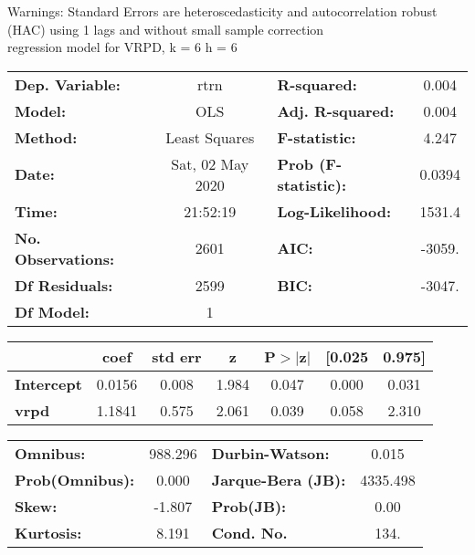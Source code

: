 Warnings: \newline
 [1] Standard Errors are heteroscedasticity and autocorrelation robust (HAC) using 1 lags and without small sample correction\\ 

regression model for VRPD, k = 6 h = 6\begin{center}
\begin{tabular}{lclc}
\toprule
\textbf{Dep. Variable:}    &       rtrn       & \textbf{  R-squared:         } &     0.004   \\
\textbf{Model:}            &       OLS        & \textbf{  Adj. R-squared:    } &     0.004   \\
\textbf{Method:}           &  Least Squares   & \textbf{  F-statistic:       } &     4.247   \\
\textbf{Date:}             & Sat, 02 May 2020 & \textbf{  Prob (F-statistic):} &   0.0394    \\
\textbf{Time:}             &     21:52:19     & \textbf{  Log-Likelihood:    } &    1531.4   \\
\textbf{No. Observations:} &        2601      & \textbf{  AIC:               } &    -3059.   \\
\textbf{Df Residuals:}     &        2599      & \textbf{  BIC:               } &    -3047.   \\
\textbf{Df Model:}         &           1      & \textbf{                     } &             \\
\bottomrule
\end{tabular}
\begin{tabular}{lcccccc}
                   & \textbf{coef} & \textbf{std err} & \textbf{z} & \textbf{P$> |$z$|$} & \textbf{[0.025} & \textbf{0.975]}  \\
\midrule
\textbf{Intercept} &       0.0156  &        0.008     &     1.984  &         0.047        &        0.000    &        0.031     \\
\textbf{vrpd}      &       1.1841  &        0.575     &     2.061  &         0.039        &        0.058    &        2.310     \\
\bottomrule
\end{tabular}
\begin{tabular}{lclc}
\textbf{Omnibus:}       & 988.296 & \textbf{  Durbin-Watson:     } &    0.015  \\
\textbf{Prob(Omnibus):} &   0.000 & \textbf{  Jarque-Bera (JB):  } & 4335.498  \\
\textbf{Skew:}          &  -1.807 & \textbf{  Prob(JB):          } &     0.00  \\
\textbf{Kurtosis:}      &   8.191 & \textbf{  Cond. No.          } &     134.  \\
\bottomrule
\end{tabular}
\end{center}

